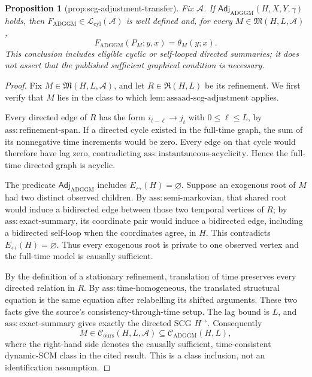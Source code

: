 \documentclass{article}
\newtheorem{proposition}{Proposition}
\begin{document}
\begin{proposition}[prop:scg-adjustment-transfer]\label{prop:scg-adjustment-transfer}
Fix \(\mathcal A\).  If \(\mathsf{Adj}_{\mathrm{ADGGM}}(H,X,Y,\gamma)\) holds, then \(F_{\mathrm{ADGGM}}\in\mathcal L_{\mathrm{cyl}}(\mathcal A)\) is well defined and, for every \(M\in\mathfrak M(H,L,\mathcal A)\),
\[
 F_{\mathrm{ADGGM}}(P_M;y,x)=\theta_M(y;x).
\]
This conclusion includes eligible cyclic or self-looped directed summaries; it does not assert that the published sufficient graphical condition is necessary.
\end{proposition}
\begin{proof}
Fix \(M\in\mathfrak M(H,L,\mathcal A)\), and let \(R\in\mathfrak R(H,L)\) be its refinement.  We first verify that \(M\) lies in the class to which \(\mathrm{lem:assaad\text{-}scg\text{-}adjustment}\) applies.

Every directed edge of \(R\) has the form \(i_{t-\ell}\to j_t\) with \(0\le\ell\le L\), by \(\mathrm{ass:refinement\text{-}span}\).  If a directed cycle existed in the full-time graph, the sum of its nonnegative time increments would be zero.  Every edge on that cycle would therefore have lag zero, contradicting \(\mathrm{ass:instantaneous\text{-}acyclicity}\).  Hence the full-time directed graph is acyclic.

The predicate \(\mathsf{Adj}_{\mathrm{ADGGM}}\) includes
\(E_{\leftrightarrow}(H)=\varnothing\).  Suppose an exogenous root of \(M\) had two distinct observed children.  By \(\mathrm{ass:semi\text{-}markovian}\), that shared root would induce a bidirected edge between those two temporal vertices of \(R\); by \(\mathrm{ass:exact\text{-}summary}\), its coordinate pair would induce a bidirected edge, including a bidirected self-loop when the coordinates agree, in \(H\).  This contradicts \(E_{\leftrightarrow}(H)=\varnothing\).  Thus every exogenous root is private to one observed vertex and the full-time model is causally sufficient.

By the definition of a stationary refinement, translation of time preserves every directed relation in \(R\).  By \(\mathrm{ass:time\text{-}homogeneous}\), the translated structural equation is the same equation after relabelling its shifted arguments.  These two facts give the source's consistency-through-time setup.  The lag bound is \(L\), and \(\mathrm{ass:exact\text{-}summary}\) gives exactly the directed SCG \(H^{\to}\).  Consequently
\[
 M\in\mathscr C_{\mathrm{ours}}(H,L,\mathcal A)
 \subseteq \mathscr C_{\mathrm{ADGGM}}(H,L),
\]
where the right-hand side denotes the causally sufficient, time-consistent dynamic-SCM class in the cited result.  This is a class inclusion, not an identification assumption.


\end{proof}
\end{document}
